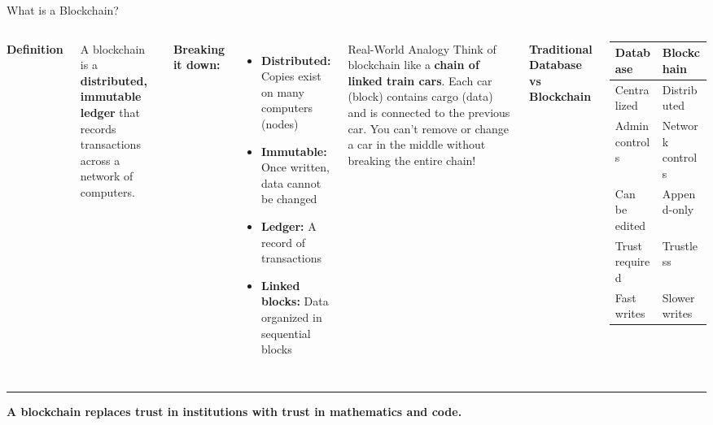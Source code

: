 \documentclass[8pt,aspectratio=169]{beamer}
\newcommand{\bottomnote}[1]{%
\vfill
\vspace{-2mm}
\textcolor{mllavender2}{\rule{\textwidth}{0.4pt}}
\vspace{1mm}
\footnotesize
\textbf{#1}
}
\begin{document}
\begin{frame}[t]{What is a Blockchain?}
\begin{columns}[T]
\textbf{Definition}

A blockchain is a \textcolor{mlpurple}{\textbf{distributed, immutable ledger}} that records transactions across a network of computers.

\vspace{1em}
\textbf{Breaking it down:}
\begin{itemize}
\item \textbf{Distributed:} Copies exist on many computers (nodes)
\item \textbf{Immutable:} Once written, data cannot be changed
\item \textbf{Ledger:} A record of transactions
\item \textbf{Linked blocks:} Data organized in sequential blocks
\end{itemize}

\vspace{0.5em}
\begin{block}{Real-World Analogy}
Think of blockchain like a \textbf{chain of linked train cars}. Each car (block) contains cargo (data) and is connected to the previous car. You can't remove or change a car in the middle without breaking the entire chain!
\end{block}

\textbf{Traditional Database vs Blockchain}

\vspace{0.5em}
\begin{tabular}{p{2cm}|p{2.5cm}}
\toprule
\textbf{Database} & \textbf{Blockchain} \\
\midrule
Centralized & Distributed \\
Admin controls & Network controls \\
Can be edited & Append-only \\
Trust required & Trustless \\
Fast writes & Slower writes \\
\bottomrule
\end{tabular}
\end{columns}

\bottomnote{A blockchain replaces trust in institutions with trust in mathematics and code.}
\end{frame}
\end{document}
